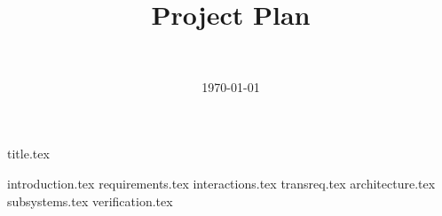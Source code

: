 \documentclass[final]{report}
\title{Project Plan}
\author{~}
\date{\today}
\begin{document}

{title.tex}
\newpage
\tableofcontents

\newpage
{}
{introduction.tex}
{requirements.tex}
{interactions.tex}
{transreq.tex}
{architecture.tex}
{subsystems.tex}
{verification.tex}
\newpage
{}

\end{document}
